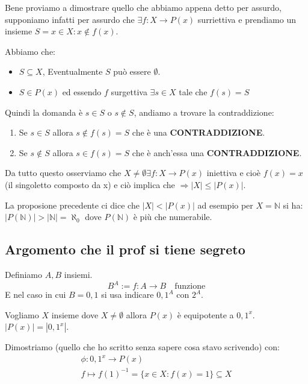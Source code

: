 \documentclass{article}
\begin{document}
Bene proviamo a dimostrare quello che abbiamo appena detto per assurdo, supponiamo infatti per assurdo che $\exists f : X \to P(x)$ surriettiva e prendiamo un insieme $S = {x \in X : x \not \in f(x)}$. \par 
Abbiamo che:
\begin{itemize}
        \item $S \subseteq X$, Eventualmente $S$ può essere $\emptyset$.
        \item $S \in P(x)$ ed essendo $f$ surgettiva $\exists s \in X$ tale che $f(s) = S$ 
\end{itemize}
Quindi la domanda è $s \in S$ o $s \not \in S$, andiamo a trovare la contraddizione:
\begin{enumerate}
        \item Se $s \in S$ allora $s \not \in f(s) = S$ che è una \textbf{CONTRADDIZIONE}.
        \item Se $s \not \in S$ allora $s \in f(s) = S$ che è anch'essa una \textbf{CONTRADDIZIONE}.
\end{enumerate}

Da tutto questo osserviamo che $X \not = \emptyset \exists f : X \to P(x)$ iniettiva e cioè $f(x) = {x}$ (il singoletto composto da x) e ciò implica che $\Rightarrow |X| \le |P(x)|$. 

La proposione precedente ci dice che $|X| < |P(x)|$ ad esempio per $X = \mathbb{N}$ si ha: \newline
$|P(\mathbb{N})| > |\mathbb{N}| = \aleph_0 $ dove $P(\mathbb{N})$ è più che numerabile.

\subsection{Argomento che il prof si tiene segreto}
Definiamo $A,B$ insiemi.
\begin{equation}
        B^A := {f:A \to B \quad \mbox{funzione}}
\end{equation}
E nel caso in cui $B = {0,1}$ si usa indicare ${0,1}^A$ con $2^A$.


Vogliamo $X$ insieme dove $X \not = \emptyset$ allora $P(x)$ è equipotente a ${0,1}^x$. \newline
$|P(x)| = |{0,1}^x|$.

Dimostriamo (quello che ho scritto senza sapere cosa stavo scrivendo) con:
\begin{align*}
        \phi : {0,1}^x \to P(x) \\
        f \mapsto {f(1)}^{-1} = \{x \in X : f(x) = 1\} \subseteq X
\end{align*}
\end{document}
